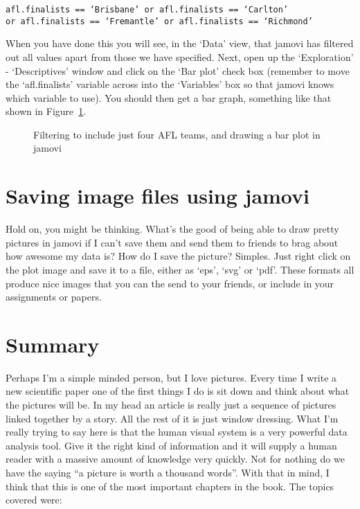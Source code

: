 \texttt{afl.finalists == `Brisbane' or afl.finalists == `Carlton' \\ \indent or afl.finalists == `Fremantle' or afl.finalists == `Richmond'}  

When you have done this you will see, in the `Data' view, that jamovi has filtered out all values apart from those we have specified. Next, open up the `Exploration' - `Descriptives' window and click on the `Bar plot' check box (remember to move the `afl.finalists' variable across into the `Variables' box so that jamovi knows which variable to use). You should then get a bar graph, something like that shown in Figure~\ref{fig:bar1}.

\vspace{0.5cm}
\begin{figure}[htp]
\begin{center}
\caption{Filtering to include just four AFL teams, and drawing a bar plot in jamovi}
\label{fig:bar1}
\end{center}
\end{figure}

\section{Saving image files using jamovi~\label{sec:saveimage}}

Hold on, you might be thinking. What's the good of being able to draw pretty pictures in jamovi if I can't save them and send them to friends to brag about how awesome my data is? How do I save the picture? Simples. Just right click on the plot image and save it to a file, either as `eps', `svg' or `pdf'. These formats all produce nice images that you can the send to your friends, or include in your assignments or papers.


\section{Summary}

Perhaps I'm a simple minded person, but I love pictures. Every time I write a new scientific paper one of the first things I do is sit down and think about what the pictures will be. In my head an article is really just a sequence of pictures linked together by a story. All the rest of it is just window dressing. What I'm really trying to say here is that the human visual system is a very powerful data analysis tool. Give it the right kind of information and it will supply a human reader with a massive amount of knowledge very quickly. Not for nothing do we have the saying ``a picture is worth a thousand words''. With that in mind, I think that this is one of the most important chapters in the book. The topics covered were:

